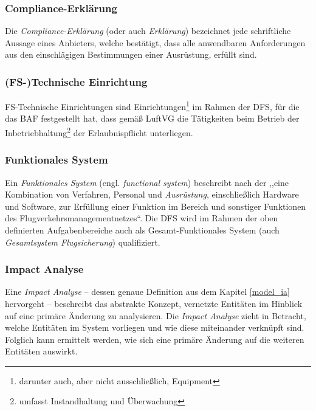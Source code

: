 \subsubsection{Compliance-Erklärung}

    Die \textit{Compliance-Erklärung} (oder auch \textit{Erklärung}) bezeichnet jede schriftliche Aussage eines \atmans{} Anbieters, welche bestätigt, dass alle anwendbaren Anforderungen aus den einschlägigen Bestimmungen einer \atmans{} Ausrüstung, erfüllt sind. 
    \cite[Art.2 Abs.10]{2018R1139}

\subsubsection{(FS-)Technische Einrichtung}

    FS-Technische Einrichtungen sind Einrichtungen\footnote{darunter auch, aber nicht ausschließlich, \atmans{} Equipment} im Rahmen der \ac{DFS}, für die das \ac{BAF} festgestellt hat, dass gemäß
    \ac{LuftVG} die Tätigkeiten beim Betrieb der Inbetriebhaltung\footnote{umfasst Instandhaltung und Überwachung} der Erlaubnispflicht unterliegen. \cite[19]{ba_technik}

\subsubsection{Funktionales System}

    Ein \textit{Funktionales System} (engl. \textit{functional system}) beschreibt nach der  ,,eine Kombination von Verfahren, Personal und \textit{Ausrüstung}, einschließlich Hardware und Software, zur Erfüllung einer Funktion im Bereich \atmans{} und sonstiger Funktionen des Flugverkehrsmanagementnetzes``\cite[Anh.I Abs.56]{2017R0373}.
    Die \ac{DFS} wird im Rahmen der oben definierten Aufgabenbereiche auch als Gesamt-Funktionales System (auch \textit{Gesamtsystem Flugsicherung}) qualifiziert.
    \cite[17]{ba_technik}

\subsubsection{Impact Analyse}

    Eine \textit{Impact Analyse} -- dessen genaue Definition aus dem Kapitel \ref{model_ia} hervorgeht -- beschreibt das abstrakte Konzept, vernetzte Entitäten im Hinblick auf eine primäre Änderung zu analysieren.
    Die \textit{Impact Analyse} zieht in Betracht, welche Entitäten im System vorliegen und wie diese miteinander verknüpft sind. 
    Folglich kann ermittelt werden, wie sich eine primäre Änderung auf die weiteren Entitäten auswirkt.